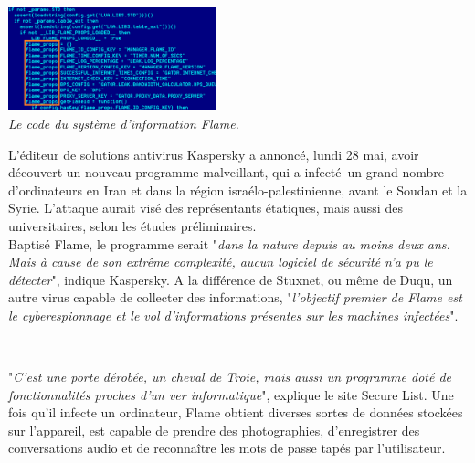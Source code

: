 \documentclass[11pt,twoside,a4paper]{article}
\begin{document}
\begin{minipage}[ht]{6.25cm}
	\includegraphics[width=6.00cm]{img/1708759_3_0e13_le-code-du-systeme-d-information-flame_37d6fd3dbe7b7274419e2accf220835e.png}
	~\\ \emph{\small Le code du syst{\`e}me d'information Flame.}
\end{minipage} \hfill \begin{minipage}[ht]{12.50cm}
	\small 
	L'{\'e}diteur de solutions antivirus Kaspersky a annonc{\'e}, lundi 28 mai, avoir d{\'e}couvert un nouveau programme malveillant, qui a infect{\'e}~\footnotemark un grand nombre d'ordinateurs en Iran et dans la r{\'e}gion isra{\'e}lo-palestinienne, avant le Soudan et la Syrie. L'attaque aurait vis{\'e} des repr{\'e}sentants {\'e}tatiques, mais aussi des universitaires, selon les {\'e}tudes pr{\'e}liminaires.~\\
	
	Baptis{\'e} Flame, le programme serait "\emph{dans la nature depuis au moins deux ans. Mais {\`a} cause de son extr{\^e}me complexit{\'e}, aucun logiciel de s{\'e}curit{\'e} n'a pu le d{\'e}tecter}", indique Kaspersky. A la diff{\'e}rence de Stuxnet, ou m{\^e}me de Duqu, un autre virus capable de collecter des informations, "\emph{l'objectif premier de Flame est le cyberespionnage et le vol d'informations pr{\'e}sentes sur les machines infect{\'e}es}".~\\
\end{minipage}
~

"\emph{C'est une porte d{\'e}rob{\'e}e, un cheval de Troie, mais aussi un programme dot{\'e} de fonctionnalit{\'e}s proches d'un ver informatique}", explique le site Secure List. Une fois qu'il infecte un ordinateur, Flame obtient diverses sortes de donn{\'e}es stock{\'e}es sur l'appareil, est capable de prendre des photographies,  d'enregistrer des conversations audio et de reconna{\^i}tre les mots de passe tap{\'e}s par l'utilisateur.~\\
\end{document}
